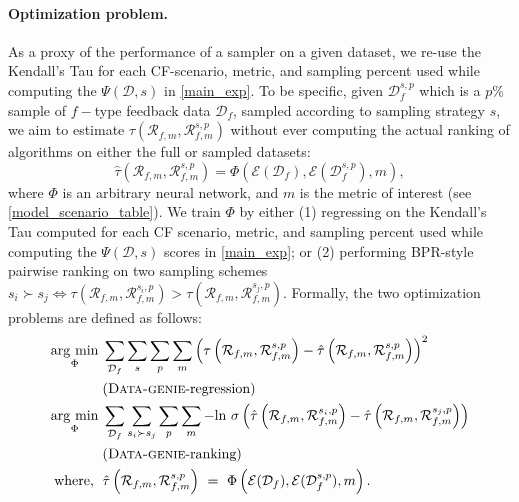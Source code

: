 \paragraph{Optimization problem.} As a proxy of the performance of a sampler on a given dataset, we re-use the Kendall's Tau for each CF-scenario, metric, and sampling percent used while computing the $\Psi(\mathcal{D}, s)$ in \cref{main_exp}. To be specific, given $\mathcal{D}_{f}^{s, p}$ which is a $p\%$ sample of $f-$type feedback data $\mathcal{D}_f$, sampled according to sampling strategy $s$, we aim to estimate $\tau(\mathcal{R}_{f, m}, \mathcal{R}_{f, m}^{s, p})$ without ever computing the actual ranking of algorithms 
on either the full or sampled datasets:
\begin{equation} \label{tau_hat}
    \hat{\tau}\left(\mathcal{R}_{f, m}, \mathcal{R}_{f, m}^{s, p}\right) = \Phi\left(\mathcal{E}(\mathcal{D}_f), \mathcal{E}(\mathcal{D}_f^{s, p}), m\right),
\end{equation}
where $\Phi$ is an arbitrary neural network, and $m$ is the metric of interest (see \cref{model_scenario_table}). We train $\Phi$ by either (1) regressing on the Kendall's Tau computed for each CF scenario, metric, and sampling percent used while computing the $\Psi(\mathcal{D}, s)$ scores in \cref{main_exp}; or (2) performing BPR-style \cite{bpr} pairwise ranking on two sampling schemes $s_i \succ s_j \iff \tau(\mathcal{R}_{f, m}, \mathcal{R}_{f, m}^{s_i, p}) > \tau(\mathcal{R}_{f, m}, \mathcal{R}_{f, m}^{s_j, p})$. Formally, the two optimization problems are defined as follows:
\begin{align*}
    \argmin{\Phi} & \sum_{\mathcal{D}_f} \sum_{s} \sum_{p} \sum_{m} \left(\tau\left(\mathcal{R}_{f, m}, \mathcal{R}_{f, m}^{s, p}\right) - \hat{\tau}\left(\mathcal{R}_{f, m}, \mathcal{R}_{f, m}^{s, p}\right) \right)^2 \\ & \text{(\oracle-regression)} \\
    \argmin{\Phi} & \sum_{\mathcal{D}_f} \sum_{s_i \succ s_j} \sum_{p} \sum_{m} -\text{ln}~\sigma\left(\hat{\tau}\left(\mathcal{R}_{f, m}, \mathcal{R}_{f, m}^{s_i, p}\right) - \hat{\tau}\left(\mathcal{R}_{f, m}, \mathcal{R}_{f, m}^{s_j, p}\right) \right) \\ & \text{(\oracle-ranking)} \\
    \text{where, \;} & \hat{\tau}\left(\mathcal{R}_{f, m}, \mathcal{R}_{f, m}^{s, p}\right) ~=~ \Phi\left(\mathcal{E}(\mathcal{D}_f), \mathcal{E}(\mathcal{D}_f^{s, p}), m\right).
\end{align*}
